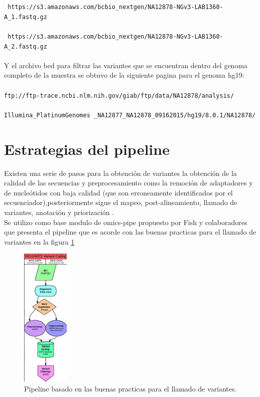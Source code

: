 {\texttt{ https://s3.amazonaws.com/bcbio\_nextgen/NA12878-NGv3-LAB1360-A\_1.fastq.gz}\\
\\
{\texttt{ https://s3.amazonaws.com/bcbio\_nextgen/NA12878-NGv3-LAB1360-A\_2.fastq.gz}}\\
\\
Y el archivo bed para filtrar las variantes que se encuentran dentro del genoma completo de la muestra se obtuvo de la siguiente pagina para el genoma hg19: \\
\\
\texttt{ftp://ftp-trace.ncbi.nlm.nih.gov/giab/ftp/data/NA12878/analysis/}\\
\\
\texttt{Illumina\_PlatinumGenomes \_NA12877\_NA12878\_09162015/hg19/8.0.1/NA12878/} 

\section{Estrategias del pipeline}

Existen una serie de pasos para la obtención de variantes la obtención de la calidad de las secuencias y preprocesamiento como la remoción de adaptadores y de nucleótidos con baja calidad (que son erroneamente identificados por el secuenciador),posteriormente sigue el mapeo, post-alineamiento, llamado de variantes, anotación y priorización \cite{Bao2014}.\\

Se utilizo como base modulo de omics-pipe propuesto por Fish y colaboradores \cite{Fisch2015} que presenta el pipeline que es acorde con las buenas practicas para el llamado de variantes en la figura \ref{fig:pipeline}
	
\begin{figure}[] 
	\centering
	\includegraphics[width=0.2\textwidth]{Kap2/pipe}
	\caption{Pipeline basado en las buenas practicas para el llamado de variantes.} \label{fig:pipeline}
\end{figure}

}
